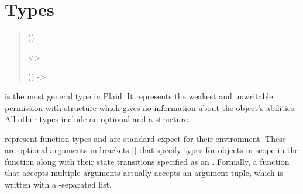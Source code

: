\section{Types}

\begin{quote}


 {}

 {} 

 {} 

 ()


 {}

 {}

 {}


 {} <>

 {}


 {} 


 {} ()  -> 


 {}

 {} 


{ {} }



\end{quote}

 is the most general type in Plaid.  It represents the weakest
and unwritable permission  with structure 
which gives no information about the object's abilities.  All other
types include an optional  and a structure.

 represent function types and are
standard expect for their environment.  These are optional 
arguments in brackets [] that specify types for objects in scope
in the function along with their state transitions specified
as an . Formally, a function that accepts 
multiple arguments actually accepts an
argument tuple, which is written with a \code{*}-separated list.

